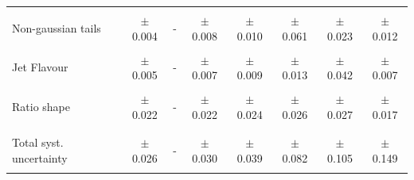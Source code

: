 \begin{table}[!hp]
\begin{tabular}{lcccccccc}
 & & & & & & & & \\
 Non-gaussian tails & & $\pm$ 0.004 & - & $\pm$ 0.008 & $\pm$ 0.010 & $\pm$ 0.061 & $\pm$ 0.023 & $\pm$ 0.012 \\
 & & & & & & & & \\ 
 Jet Flavour & & $\pm$ 0.005 & - & $\pm$ 0.007 & $\pm$ 0.009 & $\pm$ 0.013 & $\pm$ 0.042 & $\pm$ 0.007 \\
 & & & & & & & & \\ 
 Ratio shape & & $\pm$ 0.022 & - & $\pm$ 0.022 & $\pm$ 0.024 & $\pm$ 0.026 & $\pm$ 0.027 & $\pm$ 0.017 \\
 & & & & & & & & \\ 
\hline
 & & & & & & & & \\
 Total syst. uncertainty & & $\pm$ 0.026 & - & $\pm$ 0.030 & $\pm$ 0.039 & $\pm$ 0.082 & $\pm$ 0.105 & $\pm$ 0.149 \\
 & & & & & & & & \\ 
\hline
\end{tabular}%
\end{table} 

